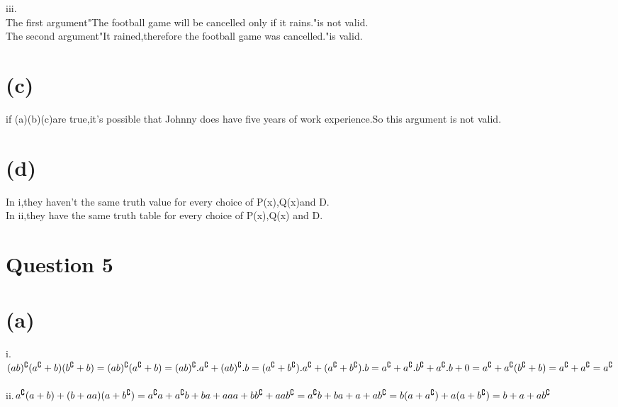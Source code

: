 \documentclass{article}
\begin{document}
iii.\\
The first argument"The football game will be cancelled only if it rains."is not valid.\\
The second argument"It rained,therefore the football game was cancelled."is valid.\\

\section*{(c)}
if (a)(b)(c)are true,it's possible that Johnny does have five years of work experience.So this argument is not valid.
\section*{(d)}
In i,they haven't the same truth value for every choice of P(x),Q(x)and D.\\
In ii,they have the same truth table for every choice of P(x),Q(x) and D.\\


\section*{Question 5}

\section*{(a)}
i.\((ab)^\complement(a^\complement+b)(b^\complement+b)\\=(ab)^\complement(a^\complement+b)\\
=(ab)^\complement.a^\complement+(ab)^\complement.b\\=(a^\complement+b^\complement).a^\complement+(a^\complement+b^\complement).b\\=a^\complement+a^\complement.b^\complement+a^\complement.b+0\\
=a^\complement+a^\complement(b^\complement+b)\\=a^\complement+a^\complement\\=a^\complement\)\\
\\
ii.\(a^\complement(a+b)+(b+aa)(a+b^\complement)\\=a^\complement a+a^\complement b+ba+aaa+bb^\complement+aab^\complement\\=a^\complement b+ba+a+ab^\complement\\=b(a+a^\complement)+a(a+b^\complement)\\=b+a+ab^\complement\)
\end{document}
